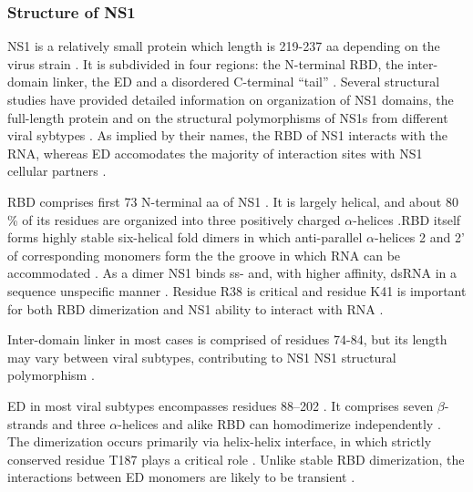 		
		\subsubsection{Structure of NS1}
		
		\gls{NS1} is a relatively small protein which length is 219-237 \gls{aa} depending on the virus strain \parencite{Hale2008b}. It is subdivided in four regions: the N-terminal \gls{RBD}, the inter-domain linker, the \gls{ED} and a disordered C-terminal ``tail'' \parencite{Hale2014}. Several structural studies have provided detailed information on organization of \gls{NS1} domains, the full-length protein and on the structural polymorphisms of \gls{NS1}s from different viral sybtypes \parencite{Chien1997, Liu1997a, Wang1999a, Bornholdt2006, Yin2007a, Hale2008c, Cheng2009, Xia2009, Kerry2011, Carrillo2014}. As implied by their names, the \gls{RBD} of NS1 interacts with the RNA, whereas \gls{ED} accomodates the majority of interaction sites with \gls{NS1} cellular partners \parencite{Hale2008b}.
		
		\gls{RBD} comprises first 73 N-terminal aa of \gls{NS1} \parencite{Qian1995a, Yin2007a}. It is largely helical, and about 80 \% of its residues are organized into three positively charged $\alpha$-helices \parencite{Qian1995a, Liu1997a}.\gls{RBD} itself forms highly stable six-helical fold dimers in which anti-parallel $\alpha$-helices 2 and 2' of corresponding monomers form the the groove in which RNA can be accommodated \parencite{Chien1997, Wang1999a}. As a dimer NS1 binds ss- and, with higher affinity, dsRNA in a sequence unspecific manner \parencite{Hatada1992, Chien1997, Qian1995}. Residue R38 is critical and residue K41 is important for both \gls{RBD} dimerization and \gls{NS1} ability to interact with RNA \parencite{Hatada1992, Wang1999a}.
		
		Inter-domain linker in most cases is comprised of residues 74-84, but its length may vary between viral subtypes, contributing to \gls{NS1} \gls{NS1} structural polymorphism \parencite{Bornholdt2006, Carrillo2014, Kerry2011}.
		
		\gls{ED} in most viral subtypes encompasses residues 88--202 \parencite{Hale2014}. It comprises seven $\beta$-strands and three $\alpha$-helices and alike \gls{RBD} can homodimerize independently \parencite{Bornholdt2006, Hale2008c, Xia2009}. The dimerization occurs primarily via helix-helix interface, in which strictly conserved residue T187 plays a critical role \parencite{Hale2008c, Kerry2011}. Unlike stable \gls{RBD} dimerization, the interactions between \gls{ED} monomers are likely to be transient \parencite{Kerry2011, Hale2014}.
		

